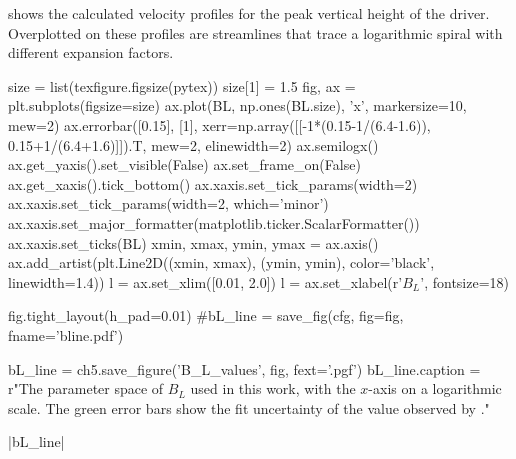  shows the calculated velocity profiles for the peak vertical height of the driver.
Overplotted on these profiles are streamlines that trace a logarithmic spiral with different expansion factors.

\begin{pycode}[chapter5]
size = list(texfigure.figsize(pytex))
size[1] = 1.5
fig, ax = plt.subplots(figsize=size)
ax.plot(BL, np.ones(BL.size), 'x', markersize=10, mew=2)
ax.errorbar([0.15], [1], xerr=np.array([[-1*(0.15-1/(6.4-1.6)), 0.15+1/(6.4+1.6)]]).T, mew=2, elinewidth=2)
ax.semilogx()
ax.get_yaxis().set_visible(False)
ax.set_frame_on(False)
ax.get_xaxis().tick_bottom()
ax.xaxis.set_tick_params(width=2)
ax.xaxis.set_tick_params(width=2, which='minor')
ax.xaxis.set_major_formatter(matplotlib.ticker.ScalarFormatter())
ax.xaxis.set_ticks(BL)
xmin, xmax, ymin, ymax = ax.axis()
ax.add_artist(plt.Line2D((xmin, xmax), (ymin, ymin), color='black', linewidth=1.4))
l = ax.set_xlim([0.01, 2.0])
l = ax.set_xlabel(r'$B_L$', fontsize=18)

fig.tight_layout(h_pad=0.01)
#bL_line = save_fig(cfg, fig=fig, fname='bline.pdf')

bL_line = ch5.save_figure('B_L_values', fig, fext='.pgf')
bL_line.caption = r"The parameter space of $B_L$ used in this work, with the $x$-axis on a logarithmic scale. The green error bars show the fit uncertainty of the value observed by \citet{bonet2008}."
\end{pycode}

\py[chapter5]|bL_line|


